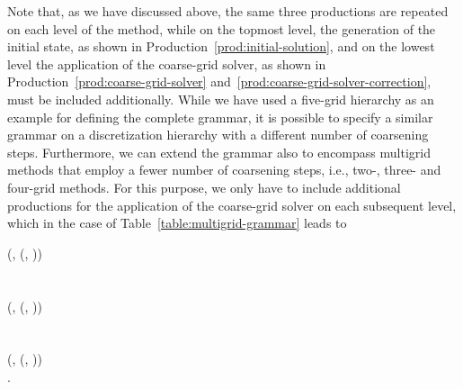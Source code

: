 Note that, as we have discussed above, the same three productions are repeated on each level of the method, while on the topmost level, the generation of the initial state, as shown in Production~\eqref{prod:initial-solution}, and on the lowest level the application of the coarse-grid solver, as shown in Production~\eqref{prod:coarse-grid-solver} and~\eqref{prod:coarse-grid-solver-correction}, must be included additionally.
While we have used a five-grid hierarchy as an example for defining the complete grammar, it is possible to specify a similar grammar on a discretization hierarchy with a different number of coarsening steps.
Furthermore, we can extend the grammar also to encompass multigrid methods that employ a fewer number of coarsening steps, i.e., two-, three- and four-grid methods.
For this purpose, we only have to include additional productions for the application of the coarse-grid solver on each subsequent level, which in the case of Table~\ref{table:multigrid-grammar} leads to
\begin{bnf*}
	 {
		(, \bnfsp {}(, \bnfsp{}))
	} \\
	 \\ \\
	 {
		(, \bnfsp {}(, \bnfsp{}))
	} \\
	 \\ \\
	 {
		(, \bnfsp {}(, \bnfsp{}))
	} \\
	.
\end{bnf*}
